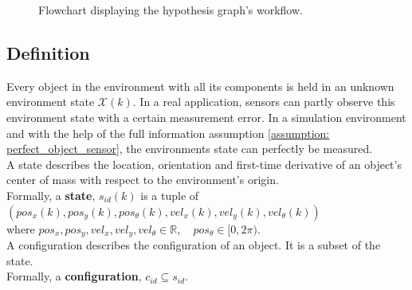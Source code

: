 \begin{figure}[H]
\caption{Flowchart displaying the hypothesis graph's workflow.}
\label{figure: flowchart_hgraph} 
\end{figure}

\subsection{Definition}
\label{subsection: defenition_hgraph}
Every object in the environment with all its components is held in an unknown environment state $\mathcal{X}(k)$. In a real application, sensors can partly observe this environment state with a certain measurement error. In a simulation environment and with the help of the full information assumption \ref{assumption: perfect_object_sensor}, the environments state can perfectly be measured.\\

A state describes the location, orientation and first-time derivative of an object's center of mass with respect to the environment's origin. \\
Formally, a \textbf{state}, $s_{id}(k)$ is a tuple of $(pos_x(k), pos_y(k), pos_\theta(k), vel_x(k), vel_y(k), vel_\theta(k))$\\ where $pos_x, pos_y, vel_x, vel_y, vel_\theta \in \mathbb{R}, \quad  pos_\theta \in [0, 2\pi)$.\\

A configuration describes the configuration of an object. It is a subset of the state.\\ Formally, a \textbf{configuration}, $c_{id} \subseteq s_{id}$. \\

